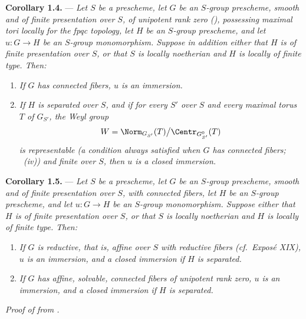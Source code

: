 \medskip
\noindent{}%
\textbf{Corollary 1.4.} --- \textit{Let \(S\) be a prescheme, let
\(G\) be an \(S\)-group prescheme, smooth and of finite presentation
over \(S\), of unipotent rank zero (), possessing
maximal tori locally for the fpqc topology, let \(H\) be an
\(S\)-group prescheme, and let \(u:G\to H\) be an \(S\)-group
monomorphism. Suppose in addition either that \(H\) is of finite
presentation over \(S\), or that \(S\) is locally noetherian and
\(H\) is locally of finite type. Then:}

\begin{enumerate}
\item[\textit{a)}] \textit{If \(G\) has connected fibers, \(u\) is
an immersion.}

\item[\textit{b)}] \textit{If \(H\) is separated over \(S\), and if
for every \(S'\) over \(S\) and every maximal torus \(T\) of
\(G_{S'}\), the Weyl group}
\[
  W=
  \Norm_{G_{S'}}(T)\big/\Centr_{G_{S'}^0}(T)
\]
\textit{is representable (a condition always satisfied when \(G\)
has connected fibers; ~(iv)) and finite over \(S\), then
\(u\) is a closed immersion.}
\end{enumerate}

\medskip
\noindent{}%
\textbf{Corollary 1.5.} --- \textit{Let \(S\) be a prescheme, let
\(G\) be an \(S\)-group prescheme, smooth and of finite presentation
over \(S\), with connected fibers, let \(H\) be an \(S\)-group
prescheme, and let \(u:G\to H\) be an \(S\)-group monomorphism.
Suppose either that \(H\) is of finite presentation over \(S\), or
that \(S\) is locally noetherian and \(H\) is locally of finite type.
Then:}

\begin{enumerate}
\item[\textit{a)}] \textit{If \(G\) is reductive, that is, affine
over \(S\) with reductive fibers (cf.\ Exposé XIX), \(u\) is an
immersion, and a closed immersion if \(H\) is separated.}

\item[\textit{b)}] \textit{If \(G\) has affine, solvable, connected
fibers of unipotent rank zero, \(u\) is an immersion, and a closed
immersion if \(H\) is separated.}
\end{enumerate}

\medskip
\noindent\textit{Proof of  from .}

